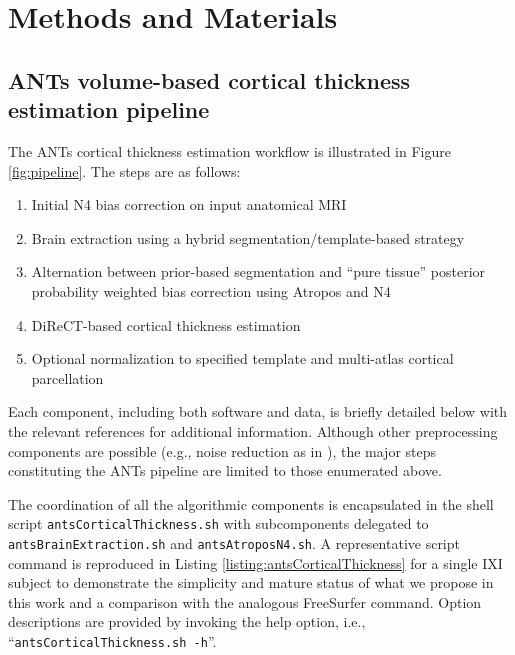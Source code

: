 \section{Methods and Materials}

\subsection{ANTs volume-based cortical thickness estimation pipeline}

The ANTs cortical thickness estimation workflow is illustrated
in Figure \ref{fig:pipeline}.  The steps are as follows:
\begin{enumerate}
  \item Initial N4 bias correction on input anatomical MRI
  \item Brain extraction using a hybrid segmentation/template-based strategy
  \item Alternation between prior-based segmentation and ``pure tissue''
        posterior probability weighted bias correction using Atropos and N4
  \item DiReCT-based cortical thickness estimation
  \item Optional normalization to specified template and multi-atlas
    cortical parcellation
\end{enumerate}
Each component, including both software and data, is briefly detailed 
below with the relevant references for additional information. 
{\color{blue}Although other preprocessing components are possible (e.g., noise reduction
as in \cite{smith1996}), the major steps constituting the ANTs pipeline 
are limited to those enumerated above.}

The coordination of all the algorithmic components is
encapsulated in the shell script {\tt antsCorticalThickness.sh} with
subcomponents delegated to {\tt antsBrainExtraction.sh} 
and {\tt antsAtroposN4.sh}.  A representative script command 
is reproduced in Listing \ref{listing:antsCorticalThickness} for
a single IXI subject to demonstrate the simplicity and
mature status of what we propose in this work and a comparison
with the analogous FreeSurfer command.  
Option descriptions are provided by invoking the
help option, i.e., ``{\tt antsCorticalThickness.sh -h}''.

